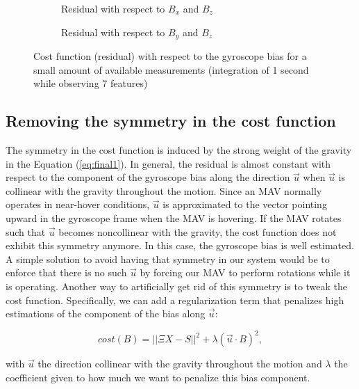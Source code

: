 \documentclass[letterpaper, 10 pt, journal, twoside]{IEEEtran}  %
\begin{document}
\begin{figure}
        \centering
        \begin{subfigure}[b]{0.7\columnwidth}
                \resizebox{\columnwidth}{!}{}
                \caption{Residual with respect to $B_x$ and $B_z$}
        \end{subfigure}

        \begin{subfigure}[b]{0.7\columnwidth}
                \resizebox{\columnwidth}{!}{}
                \caption{Residual with respect to $B_y$ and $B_z$}
        \end{subfigure}
        \caption{Cost function (residual) with respect to the gyroscope bias for a small amount of available measurements (integration of 1 second while observing 7 features)\label{fig:cost}}
\end{figure}

\subsection{Removing the symmetry in the cost function \label{sec:symmetry}}

The symmetry in the cost function is induced by the strong weight of the gravity in the Equation (\ref{eq:final1}).
In general, the residual is almost constant with respect to the component of the gyroscope bias along the direction $\vec{u}$ when $\vec{u}$ is collinear with the gravity throughout the motion.
Since an MAV normally operates in near-hover conditions, $\vec{u}$ is approximated to the vector pointing upward in the gyroscope frame when the MAV is hovering.
If the MAV rotates such that $\vec{u}$ becomes noncollinear with the gravity, the cost function does not exhibit this symmetry anymore.
In this case, the gyroscope bias is well estimated.
A simple solution to avoid having that symmetry in our system would be to enforce that there is no such $\vec{u}$ by forcing our MAV to perform rotations while it is operating.
Another way to artificially get rid of this symmetry is to tweak the cost function.
Specifically, we can add a regularization term that penalizes high estimations of the component of the bias along $\vec{u}$:

\begin{equation}
cost(B) = ||\Xi X - S||^2 + \lambda (\vec{u} \cdot B)^2,
\end{equation}


\noindent with $\vec{u}$ the direction collinear with the gravity throughout the motion and  $\lambda$ the coefficient given to how much we want to penalize this bias component.
\end{document}

